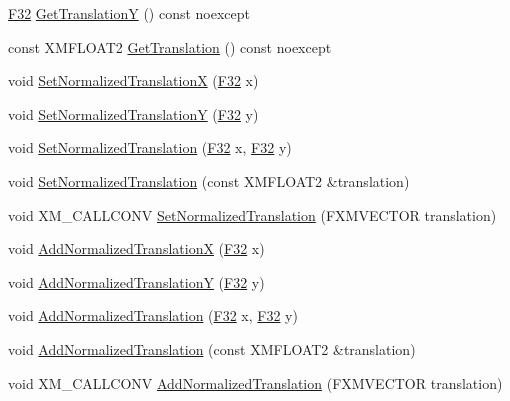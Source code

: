 \begin{DoxyCompactItemize}
\hyperlink{namespacemage_aa97e833b45f06d60a0a9c4fc22ae02c0}{F32} \hyperlink{classmage_1_1_sprite_transform_a45ac68b47fb751b8c3908524177c37c8}{Get\+TranslationY} () const noexcept
\item 
const X\+M\+F\+L\+O\+A\+T2 \hyperlink{classmage_1_1_sprite_transform_ae8103fdc37f52d294d3703709949a30c}{Get\+Translation} () const noexcept
\item 
void \hyperlink{classmage_1_1_sprite_transform_ab7b14055dc7dbd47e28881a1c46a7522}{Set\+Normalized\+TranslationX} (\hyperlink{namespacemage_aa97e833b45f06d60a0a9c4fc22ae02c0}{F32} x)
\item 
void \hyperlink{classmage_1_1_sprite_transform_aac384e3769b23e4452e6dd7b416146fa}{Set\+Normalized\+TranslationY} (\hyperlink{namespacemage_aa97e833b45f06d60a0a9c4fc22ae02c0}{F32} y)
\item 
void \hyperlink{classmage_1_1_sprite_transform_a954e7a562a7c68ef402881dc982529ba}{Set\+Normalized\+Translation} (\hyperlink{namespacemage_aa97e833b45f06d60a0a9c4fc22ae02c0}{F32} x, \hyperlink{namespacemage_aa97e833b45f06d60a0a9c4fc22ae02c0}{F32} y)
\item 
void \hyperlink{classmage_1_1_sprite_transform_a2718ece51fa0cdd839620df93ac49ff1}{Set\+Normalized\+Translation} (const X\+M\+F\+L\+O\+A\+T2 \&translation)
\item 
void X\+M\+\_\+\+C\+A\+L\+L\+C\+O\+NV \hyperlink{classmage_1_1_sprite_transform_af72bc622e7512910e5a9ceb8aeeec22d}{Set\+Normalized\+Translation} (F\+X\+M\+V\+E\+C\+T\+OR translation)
\item 
void \hyperlink{classmage_1_1_sprite_transform_af766622e394f2ace0e2f999d6c642bb5}{Add\+Normalized\+TranslationX} (\hyperlink{namespacemage_aa97e833b45f06d60a0a9c4fc22ae02c0}{F32} x)
\item 
void \hyperlink{classmage_1_1_sprite_transform_aea97be812ff2a83bd255d3419354dbe3}{Add\+Normalized\+TranslationY} (\hyperlink{namespacemage_aa97e833b45f06d60a0a9c4fc22ae02c0}{F32} y)
\item 
void \hyperlink{classmage_1_1_sprite_transform_a4a55fcd4d288b5d7f7703b9a6232b2d1}{Add\+Normalized\+Translation} (\hyperlink{namespacemage_aa97e833b45f06d60a0a9c4fc22ae02c0}{F32} x, \hyperlink{namespacemage_aa97e833b45f06d60a0a9c4fc22ae02c0}{F32} y)
\item 
void \hyperlink{classmage_1_1_sprite_transform_ad5d6e1ab0012287f6ee52d19426ed6cf}{Add\+Normalized\+Translation} (const X\+M\+F\+L\+O\+A\+T2 \&translation)
\item 
void X\+M\+\_\+\+C\+A\+L\+L\+C\+O\+NV \hyperlink{classmage_1_1_sprite_transform_a167f79e773eeb4dca46915f748726113}{Add\+Normalized\+Translation} (F\+X\+M\+V\+E\+C\+T\+OR translation)

\end{DoxyCompactItemize}
